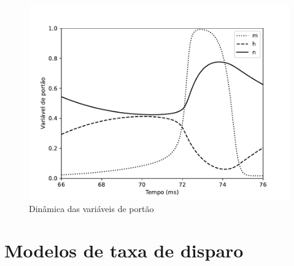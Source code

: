 \begin{figure}[htb!]
	\centering
	\caption{Dinâmica das variáveis de portão}
	\label{fig:portoes}
	\includegraphics[width=0.7\linewidth]{figs/portoes}
\end{figure}
\section{Modelos de taxa de disparo}\label{sec:modelostaxa}

